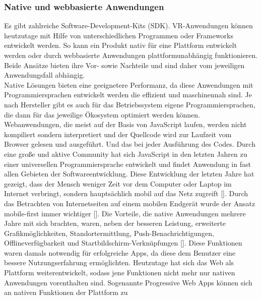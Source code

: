 \documentclass[a4paper,12pt,oneside]{article}
\begin{document}
      \subsubsection{Native und webbasierte Anwendungen}
        Es gibt zahlreiche Software-Development-Kits (SDK).
        VR-Anwendungen können heutzutage mit Hilfe von unterschiedlichen Programmen oder Frameworks entwickelt
        werden. So kann ein Produkt nativ für eine Plattform entwickelt werden oder durch
        webbasierte Anwendungen plattformunabhängig funktionieren.
        Beide Ansätze bieten ihre Vor- sowie Nachteile und sind daher vom jeweiligen 
        Anwendungsfall abhängig. \\
        Native Lösungen bieten eine geeignetere
        Performanz, da diese Anwendungen mit Programmiersprachen entwickelt werden die
        effizient und maschinennah sind. Je nach Hersteller gibt es auch für das 
        Betriebssystem eigene Programmiersprachen, die dann für das jeweilige Ökosystem 
        optimiert werden können. \\
        Webanwendungen, die meist auf der Basis von JavaScript laufen, werden nicht 
        kompiliert sondern interpretiert und der Quellcode wird zur Laufzeit vom Browser 
        gelesen und ausgeführt. Und das bei jeder Ausführung des Codes.
        Durch eine große und aktive Community hat sich JavaScript in den letzten Jahren 
        zu einer universellen Programmiersprache entwickelt und findet Anwendung in
        fast allen Gebieten der Softwareentwicklung.
        Diese Entwicklung der letzten Jahre hat gezeigt, dass der Mensch weniger
        Zeit vor dem Computer oder Laptop im Internet verbringt, sondern hauptsächlich mobil auf das Netz zugreift 
        [\cite[1]{Ater2017}].
        Durch das Betrachten von Internetseiten auf einem mobilen Endgerät wurde der
        Ansatz mobile-first immer wichtiger [\cite[1]{Ater2017}]. Die Vorteile, die native
        Anwendungen mehrere Jahre mit sich brachten, waren, neben der besseren Leistung,
        erweiterte Grafikmöglichkeiten, Standortermittlung, Push-Benachrichtigungen,
        Offlineverfügbarkeit und Startbildschirm-Verknüpfungen [\cite[3]{Ater2017}]. Diese
        Funktionen waren damals notwendig für erfolgreiche Apps, da diese dem
        Benutzer eine bessere Nutzungserfahrung ermöglichten. 
        Heutzutage hat sich das Web als Plattform weiterentwickelt, sodass jene Funktionen nicht
        mehr nur nativen Anwendungen vorenthalten sind.
        Sogenannte Progressive Web Apps können sich an nativen Funktionen der Plattform zu
\end{document}
